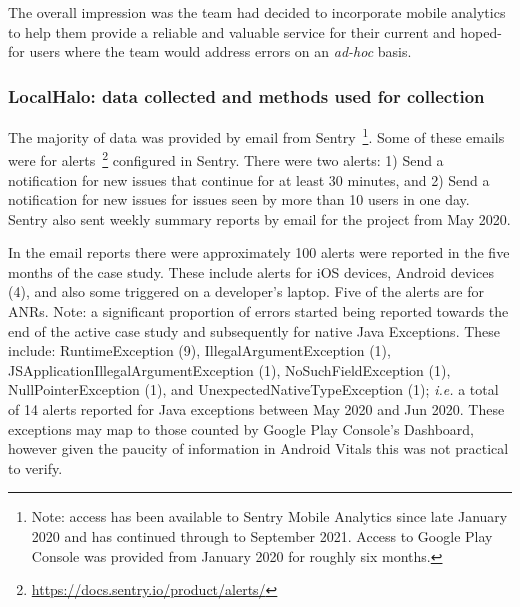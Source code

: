 The overall impression was the team had decided to incorporate mobile analytics to help them provide a reliable and valuable service for their current and hoped-for users where the team would address errors on an \emph{ad-hoc} basis.

\subsubsection{LocalHalo: data collected and methods used for collection}
The majority of data was provided by email from Sentry~\footnote{Note: access has been available to Sentry Mobile Analytics since late January 2020 and has continued through to September 2021. Access to Google Play Console was provided from  January 2020 for roughly six months.}. Some of these emails were for alerts~\footnote{\url{https://docs.sentry.io/product/alerts/}} configured in Sentry. There were two alerts: 1) Send a notification for new issues that continue for at least 30 minutes, and 2) Send a notification for new issues for issues seen by more than 10 users in one day. Sentry also sent weekly summary reports by email for the project from  May 2020.

In the email reports there were approximately 100 alerts were reported in the five months of the case study. These include alerts for iOS devices, Android devices (4), %
and also some triggered on a developer's laptop. Five of the alerts are for ANRs. Note: a significant proportion of errors started being reported towards the end of the active case study and subsequently for native Java Exceptions. These include: RuntimeException (9), IllegalArgumentException (1), JSApplicationIllegalArgumentException (1), NoSuchFieldException (1), NullPointerException (1), and UnexpectedNativeTypeException (1); \emph{i.e.} a total of 14 alerts reported for Java exceptions between  May 2020 and  Jun 2020. %
These exceptions may map to those counted by Google Play Console's Dashboard, however given the paucity of information in Android Vitals this was not practical to verify.

